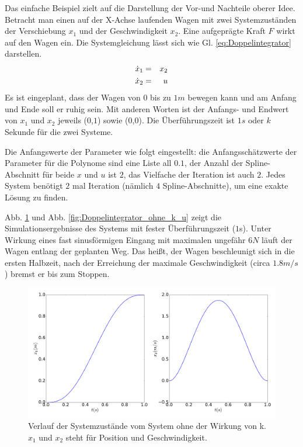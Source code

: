 \begin{beispiel}[Doppelintegrator]
	Das einfache Beispiel zielt auf die Darstellung der Vor-und Nachteile oberer Idee. Betracht man einen auf der X-Achse laufenden Wagen mit zwei Systemzuständen der Verschiebung $x_{1}$ und der Geschwindigkeit $x_{2}$. Eine aufgeprägte Kraft $F$ wirkt auf den Wagen ein. Die Systemgleichung lässt sich wie Gl. \ref{eq:Doppelintegrator} darstellen.
	\begin{eqnarray}
	\dot{x}_{1} &=& x_{2}\notag\\
	\dot{x}_{2} &=& u
	\label{eq:Doppelintegrator}
	\end{eqnarray}
	Es ist eingeplant, dass der Wagen von $0$ bis zu $1m$ bewegen kann und am Anfang und Ende soll er ruhig sein. Mit anderen Worten ist der Anfangs- und Endwert von $x_{1}$ und $x_{2}$ jeweils ($0$,$1$) sowie ($0$,$0$). Die Überführungszeit ist $1s$ oder $k$ Sekunde für die zwei Systeme. 
	
	Die Anfangswerte der Parameter wie folgt eingestellt: die Anfangsschätzwerte der Parameter für die Polynome sind eine Liste all $0.1$, der Anzahl der Spline-Abschnitt für beide $x$ und $u$ ist $2$, das Vielfache der Iteration ist auch $2$. Jedes System benötigt $2$ mal Iteration (nämlich $4$ Spline-Abschnitte), um eine exakte Lösung zu finden.
	
	Abb. \ref{fig:Doppelintegrator_ohne_k_x} und Abb. \ref{fig:Doppelintegrator_ohne_k_u} zeigt die Simulationsergebnisse des Systems mit fester Überführungszeit ($1$s). Unter Wirkung  eines fast sinusförmigen Eingang mit maximalen ungefähr $6N$ läuft der Wagen entlang der geplanten Weg. Das heißt, der Wagen beschleunigt sich in die ersten Halbzeit, nach der Erreichung der maximale Geschwindigkeit (circa $1.8m/s$) bremst er bis zum Stoppen.
	\begin{figure}
		\centering
		\includegraphics[width=15.5cm]{bild/30_32/test0_ohne_k_ori_x.pdf}
		\caption{Verlauf der Systemzustände vom System ohne der Wirkung von k. $x_{1}$ und $x_{2}$ steht für Position und Geschwindigkeit.}
		\label{fig:Doppelintegrator_ohne_k_x}
	\end{figure}
	

\end{beispiel}
